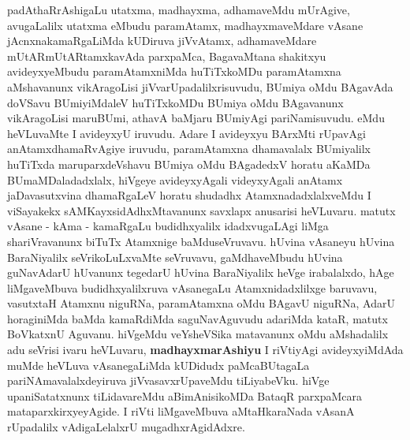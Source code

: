 \begin{artha}
padAthaRrAshigaLu utatxma, madhayxma, adhamaveMdu mUrAgive,
avugaLalilx utatxma eMbudu paramAtamx, madhayxmaveMdare vAsane
jAcnxnakamaRgaLiMda kUDiruva jiVvAtamx, adhamaveMdare
mUtARmUtARtamxkavAda parxpaMca, BagavaMtana shakitxyu avideyxyeMbudu
paramAtamxniMda huTiTxkoMDu paramAtamxna aMshavanunx vikAragoLisi
jiVvarUpadalilxrisuvudu, BUmiya oMdu BAgavAda doVSavu BUmiyiMdaleV
huTiTxkoMDu BUmiya oMdu BAgavanunx vikAragoLisi maruBUmi, athavA
baMjaru BUmiyAgi pariNamisuvudu. eMdu heVLuvaMte I  avideyxyU
iruvudu. Adare I avideyxyu BArxMti rUpavAgi anAtamxdhamaRvAgiye
iruvudu, paramAtamxna dhamavalalx BUmiyalilx huTiTxda maruparxdeVshavu
BUmiya oMdu BAgadedxV horatu aKaMDa BUmaMDaladadxlalx, hiVgeye
avideyxyAgali videyxyAgali anAtamx jaDavasutxvina dhamaRgaLeV horatu
shudadhx AtamxnadadxlalxveMdu I viSayakekx sAMKayxsidAdhxMtavanunx
savxlapx anusarisi heVLuvaru. matutx vAsane - kAma - kamaRgaLu
budidhxyalilx idadxvugaLAgi liMga shariVravanunx biTuTx Atamxnige
baMduseVruvavu. hUvina vAsaneyu hUvina BaraNiyalilx seVrikoLuLxvaMte
seVruvavu, gaMdhaveMbudu hUvina guNavAdarU hUvanunx tegedarU hUvina
BaraNiyalilx heVge irabalalxdo, hAge liMgaveMbuva budidhxyalilxruva
vAsanegaLu Atamxnidadxlilxge baruvavu, vasutxtaH Atamxnu niguRNa,
paramAtamxna oMdu BAgavU  niguRNa, AdarU horaginiMda baMda kamaRdiMda
saguNavAguvudu adariMda kataR, matutx BoVkatxnU Aguvanu. hiVgeMdu
veYsheVSika matavanunx oMdu aMshadalilx adu seVrisi ivaru heVLuvaru,
\textbf{madhayxmarAshiyu} I riVtiyAgi avideyxyiMdAda muMde heVLuva
vAsanegaLiMda kUDidudx paMcaBUtagaLa pariNAmavalalxdeyiruva
jiVvasavxrUpaveMdu tiLiyabeVku. hiVge upaniSatatxnunx tiLidavareMdu
aBimAnisikoMDa BataqR parxpaMcara mataparxkirxyeyAgide. I riVti
liMgaveMbuva aMtaHkaraNada vAsanA rUpadalilx vAdigaLelalxrU mugadhxrAgidAdxre.
\end{artha}

\centerline{}

